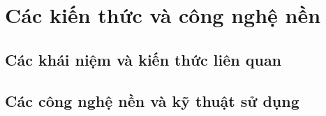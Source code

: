 \chapter{Các kiến thức và công nghệ nền}

\section{Các khái niệm và kiến thức liên quan}

\section{Các công nghệ nền và kỹ thuật sử dụng}